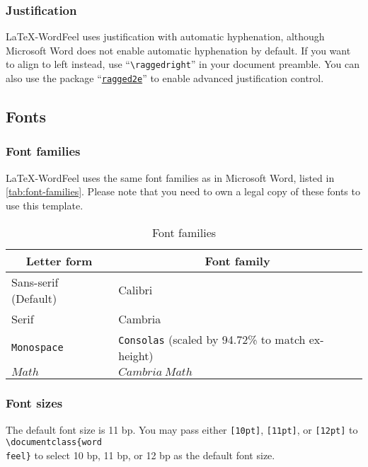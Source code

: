 \documentclass[letterpaper]{wordfeel}
\begin{document}
\subsubsection{Justification}

\LaTeX-WordFeel uses justification with automatic hyphenation, although Microsoft Word does not enable automatic hyphenation by default. If you want to align to left instead, use ``\texttt{\textbackslash{}raggedright}'' in your document preamble. You can also use the package ``\href{https://ctan.org/pkg/ragged2e}{\texttt{ragged2e}}'' to enable advanced justification control.

\subsection{Fonts}

\subsubsection{Font families}

\FloatBarrier

\LaTeX-WordFeel uses the same font families as in Microsoft Word, listed in \autoref{tab:font-families}. Please note that you need to own a legal copy of these fonts to use this template.

\begin{table}[htb]
    \centering
    \caption{Font families}
    \label{tab:font-families}
    \begin{tabular}{ll}
        \toprule
        \multicolumn{1}{c}{Letter form} & \multicolumn{1}{c}{Font family} \\
        \midrule
        \textsf{Sans-serif (Default)} & \textsf{Calibri} \\
        \textrm{Serif} & \textrm{Cambria} \\
        \texttt{Monospace} & \texttt{Consolas} (scaled by 94.72\% to match ex-height) \\
        $Math$ & $Cambria\ Math$ \\
        \bottomrule
    \end{tabular}
\end{table}

\FloatBarrier

\subsubsection{Font sizes}

The default font size is 11 bp. You may pass either \texttt{[10pt]}, \texttt{[11pt]}, or \texttt{[12pt]} to \texttt{\textbackslash{}documentclass\{word\\feel\}} to select 10 bp, 11 bp, or 12 bp as the default font size.
\end{document}
